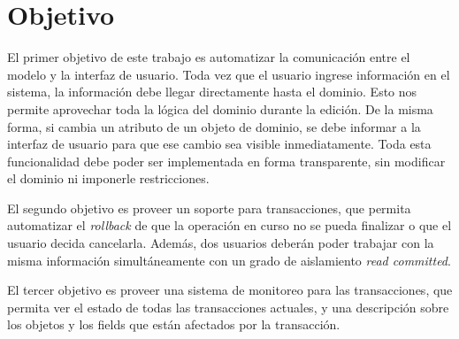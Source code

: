 \section{Objetivo}
\label{sec:Objetivo}
El primer objetivo de este trabajo es automatizar la comunicación entre el
modelo y la interfaz de usuario.
Toda vez que el usuario ingrese información en el sistema, la
información debe llegar directamente hasta el dominio. Esto nos permite
aprovechar toda la lógica del dominio durante la edición.
De la misma forma, si cambia un atributo de un objeto de dominio, se debe
informar a la interfaz de usuario para que ese cambio sea visible
inmediatamente.
Toda esta funcionalidad debe poder ser implementada en forma transparente,
sin modificar el dominio ni imponerle restricciones.

El segundo objetivo es proveer un soporte para transacciones, que
permita automatizar el \emph{rollback} de que la operación en curso no se pueda
finalizar o que el usuario decida cancelarla.
Además, dos usuarios deberán poder trabajar con la misma información
simultáneamente con un grado de aislamiento \emph{read committed}.

El tercer objetivo es proveer una sistema de monitoreo para las transacciones,
que permita ver el estado de todas las transacciones actuales, y una descripción
sobre los objetos y los fields que están afectados por la transacción.
